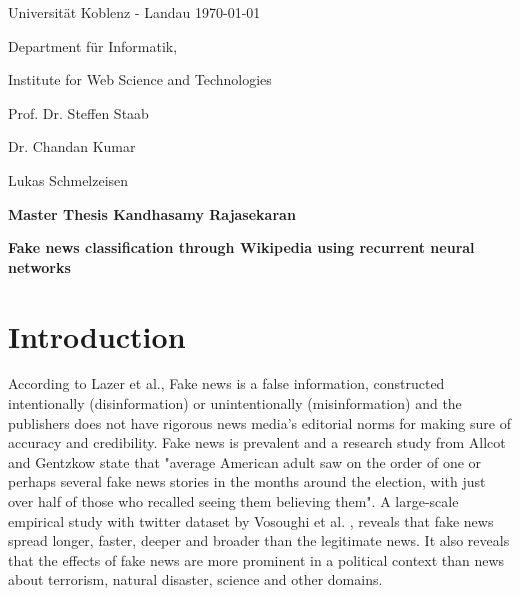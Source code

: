 \documentclass[a4paper, 11pt]{article}
\newcommand{\myName}{Kandhasamy Rajasekaran}
\newcommand{\Title}{Fake news classification through Wikipedia using recurrent neural networks}
\newcommand{\subject}{Institute for Web Science and Technologies}
\newcommand{\expert}{Prof. Dr. Steffen Staab}%
\newcommand{\supervisor}{Dr. Chandan Kumar} %
\newcommand{\secondSupervisor}{Lukas Schmelzeisen} %
\newcommand{\type}{Master Thesis}
\begin{document}
Universit\"{a}t Koblenz - Landau \hfill \today

Department f\"{u}r Informatik,

\subject{}

\expert{}

\supervisor{}

\secondSupervisor{}

\begin{center}
	\large{\bf \type{}  \myName{}}

	\vspace*{0.5cm}

	\large{\bf \Title}
\end{center}

\setlength{\parskip}{1.5ex plus0.5ex minus 0.5ex}
\begin{abstract}
\frenchspacing
\noindent
The unprecedented growth in production and dissemination of information leads to an unprecedented growth in production and dissemination of fake news. Fake news hinders the society from progress by delaying the pursuit of right information. It is very essential to have a mechanism to detect and control fake news. Several organizations uses collaborative efforts of domain experts, a manual process which cannot withstand the proliferation of news production and dissemination. This research work will use Wikipedia as a ground reality and cross check claims automatically. Recurrent neural networks will be used to understand Wikipedia and the performance of different configurations of Neural Networks will be benchmarked against each other and the already available automated fake news detectors.
\end{abstract}
\section{Introduction}
\frenchspacing

According to Lazer et al.\cite{Lazer1094}, Fake news is a false information, constructed intentionally (disinformation) or unintentionally (misinformation) and the publishers does not have rigorous news media's editorial norms for making sure of accuracy and credibility. Fake news is prevalent and a research study from Allcot and Gentzkow \cite{Allcott2017} state that "average American adult saw on the order of one or perhaps several fake news stories in the months around the election, with just over half of those who recalled seeing them believing them". A large-scale empirical study with twitter dataset by Vosoughi et al. \cite{Vosoughi1146}, reveals that fake news spread longer, faster, deeper and broader than the legitimate news. It also reveals that the effects of fake news are more prominent in a political context than news about terrorism, natural disaster, science and other domains.
\end{document}
